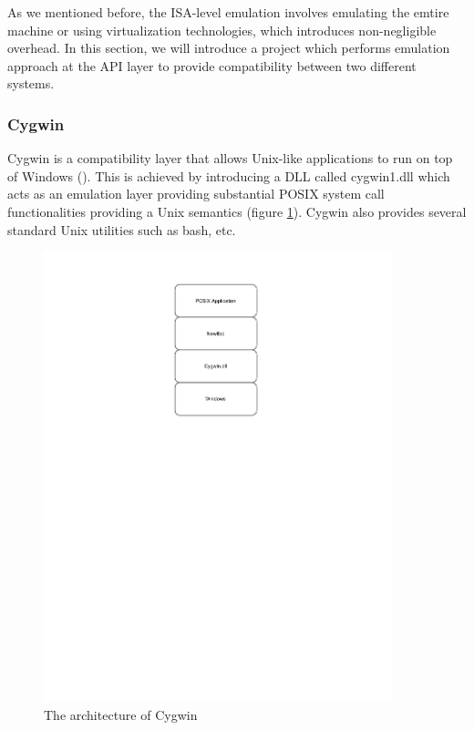 As we mentioned before, the ISA-level emulation involves emulating the emtire machine or using virtualization technologies, which introduces non-negligible overhead. In this section, we will introduce a project which performs emulation approach at the API layer to provide compatibility between two different systems.

\subsubsection{Cygwin}


Cygwin is a compatibility layer that allows Unix-like applications to run on top of Windows (\cite{enwikicygwin}). This is achieved by introducing a DLL called cygwin1.dll which acts as an emulation layer providing substantial POSIX system call functionalities providing a Unix semantics (figure \ref{fig:cyg}). Cygwin also provides several standard Unix utilities such as bash, etc.

\begin{figure}[h]
    \centering
    \includegraphics[clip, trim=0.5cm 16cm 3cm 0.5cm, width=0.9\textwidth, height=0.8\textwidth]{ch2/Cyg-arch.pdf}
    \caption{The architecture of Cygwin}
    \label{fig:cyg}
\end{figure}

